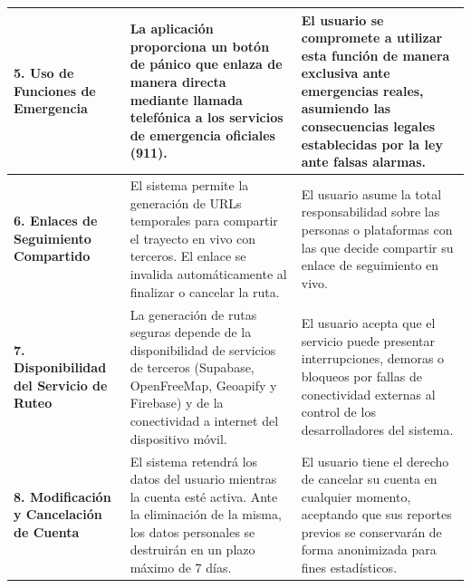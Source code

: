 \begin{longtable}{|>{\raggedright\arraybackslash}p{}|>{\raggedright\arraybackslash}p{}|>{\raggedright\arraybackslash}p{}|}
\textbf{5. Uso de Funciones de Emergencia} & 
La aplicación proporciona un botón de pánico que enlaza de manera directa mediante llamada telefónica a los servicios de emergencia oficiales (911). & 
El usuario se compromete a utilizar esta función de manera exclusiva ante emergencias reales, asumiendo las consecuencias legales establecidas por la ley ante falsas alarmas. \\ \hline

\textbf{6. Enlaces de Seguimiento Compartido} & 
El sistema permite la generación de URLs temporales para compartir el trayecto en vivo con terceros. El enlace se invalida automáticamente al finalizar o cancelar la ruta. & 
El usuario asume la total responsabilidad sobre las personas o plataformas con las que decide compartir su enlace de seguimiento en vivo. \\ \hline

\textbf{7. Disponibilidad del Servicio de Ruteo} & 
La generación de rutas seguras depende de la disponibilidad de servicios de terceros (Supabase, OpenFreeMap, Geoapify y Firebase) y de la conectividad a internet del dispositivo móvil. & 
El usuario acepta que el servicio puede presentar interrupciones, demoras o bloqueos por fallas de conectividad externas al control de los desarrolladores del sistema. \\ \hline

\textbf{8. Modificación y Cancelación de Cuenta} & 
El sistema retendrá los datos del usuario mientras la cuenta esté activa. Ante la eliminación de la misma, los datos personales se destruirán en un plazo máximo de 7 días. & 
El usuario tiene el derecho de cancelar su cuenta en cualquier momento, aceptando que sus reportes previos se conservarán de forma anonimizada para fines estadísticos. \\ \hline
\end{longtable}

